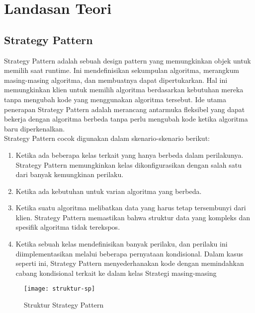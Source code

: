 \chapter{Landasan Teori}
\label{chap:teori}

\section{Strategy Pattern}
\label{sec:strategypattern}
Strategy Pattern adalah sebuah design pattern yang memungkinkan objek untuk memilih saat runtime. Ini mendefinisikan sekumpulan algoritma, merangkum masing-masing algoritma, dan membuatnya dapat dipertukarkan. Hal ini memungkinkan klien untuk memilih algoritma berdasarkan kebutuhan mereka tanpa mengubah kode yang menggunakan algoritma tersebut. Ide utama penerapan Strategy Pattern adalah merancang antarmuka fleksibel yang dapat bekerja dengan algoritma berbeda tanpa perlu mengubah kode ketika algoritma baru diperkenalkan. \\
Strategy Pattern cocok digunakan dalam skenario-skenario berikut:
\begin{enumerate}
    \item Ketika ada beberapa kelas terkait yang hanya berbeda dalam perilakunya. Strategy Pattern memungkinkan kelas dikonfigurasikan dengan salah satu dari banyak kemungkinan perilaku.
    \item Ketika ada kebutuhan untuk varian algoritma yang berbeda.
    \item Ketika suatu algoritma melibatkan data yang harus tetap tersembunyi dari klien. Strategy Pattern memastikan bahwa struktur data yang kompleks dan spesifik algoritma tidak terekspos.
    \item Ketika sebuah kelas mendefinisikan banyak perilaku, dan perilaku ini diimplementasikan melalui beberapa pernyataan kondisional. Dalam kasus seperti ini, Strategy Pattern menyederhanakan kode dengan memindahkan cabang kondisional terkait ke dalam kelas Strategi masing-masing
\end{enumerate}
\begin{figure}[h] 
	\centering  
	\texttt{[image: struktur-sp]}  
	\caption{Struktur Strategy Pattern}
	\label{fig:struktursp} 
\end{figure}

